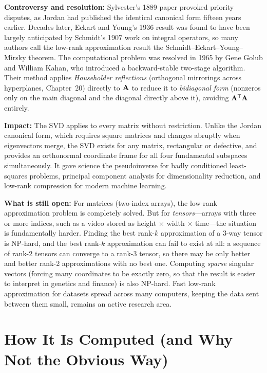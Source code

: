 \begin{historybox}
\textbf{Controversy and resolution:} Sylvester's 1889 paper provoked priority disputes, as Jordan had published the identical canonical form fifteen years earlier. Decades later, Eckart and Young's 1936 result was found to have been largely anticipated by Schmidt's 1907 work on integral operators, so many authors call the low-rank approximation result the Schmidt--Eckart--Young--Mirsky theorem. The computational problem was resolved in 1965 by Gene Golub and William Kahan, who introduced a backward-stable two-stage algorithm. Their method applies \emph{Householder reflections} (orthogonal mirrorings across hyperplanes, Chapter~20) directly to $\mathbf{A}$ to reduce it to \emph{bidiagonal form} (nonzeros only on the main diagonal and the diagonal directly above it), avoiding $\mathbf{A}^{\mathsf{T}}\mathbf{A}$ entirely.

\textbf{Impact:} The SVD applies to every matrix without restriction. Unlike the Jordan canonical form, which requires square matrices and changes abruptly when eigenvectors merge, the SVD exists for any matrix, rectangular or defective, and provides an orthonormal coordinate frame for all four fundamental subspaces simultaneously. It gave science the pseudoinverse for badly conditioned least-squares problems, principal component analysis for dimensionality reduction, and low-rank compression for modern machine learning.

\textbf{What is still open:} For matrices (two-index arrays), the low-rank approximation problem is completely solved. But for \emph{tensors}---arrays with three or more indices, such as a video stored as height $\times$ width $\times$ time---the situation is fundamentally harder. Finding the best rank-$k$ approximation of a 3-way tensor is NP-hard, and the best rank-$k$ approximation can fail to exist at all: a sequence of rank-2 tensors can converge to a rank-3 tensor, so there may be only better and better rank-2 approximations with no best one. Computing \emph{sparse} singular vectors (forcing many coordinates to be exactly zero, so that the result is easier to interpret in genetics and finance) is also NP-hard. Fast low-rank approximation for datasets spread across many computers, keeping the data sent between them small, remains an active research area.
\end{historybox}

\section{How It Is Computed (and Why Not the Obvious Way)}
\label{ch29:computation}

